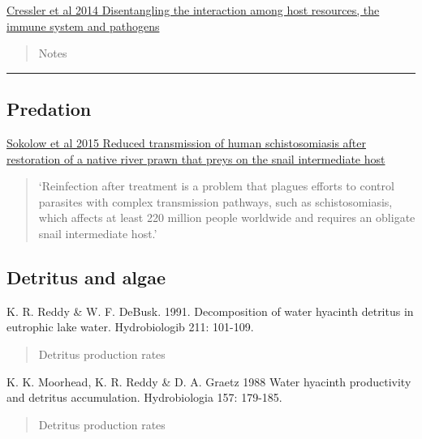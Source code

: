 \documentclass[10,portrait]{article}
\begin{document}
\href{https://onlinelibrary.wiley.com/doi/pdf/10.1111/ele.12229}{Cressler
et al 2014 Disentangling the interaction among host resources, the
immune system and pathogens}

\begin{quote}
Notes
\end{quote}

\newpage  

\begin{center}\rule{0.5\linewidth}{\linethickness}\end{center}

\subsection{Predation}\label{predation}

\href{http://www.pnas.org/content/pnas/early/2015/07/15/1502651112.full.pdf}{Sokolow
et al 2015 Reduced transmission of human schistosomiasis after
restoration of a native river prawn that preys on the snail intermediate
host}

\begin{quote}
`Reinfection after treatment is a problem that plagues efforts to
control parasites with complex transmission pathways, such as
schistosomiasis, which affects at least 220 million people worldwide and
requires an obligate snail intermediate host.'
\end{quote}

\begin{quote}
\end{quote}

\newpage  

\subsection{Detritus and algae}\label{detritus-and-algae}

K. R. Reddy \& W. F. DeBusk. 1991. Decomposition of water hyacinth
detritus in eutrophic lake water. Hydrobiologib 211: 101-109.

\begin{quote}
Detritus production rates
\end{quote}

K. K. Moorhead, K. R. Reddy \& D. A. Graetz 1988 Water hyacinth
productivity and detritus accumulation. Hydrobiologia 157: 179-185.

\begin{quote}
Detritus production rates
\end{quote}

\printbibliography
\end{document}
